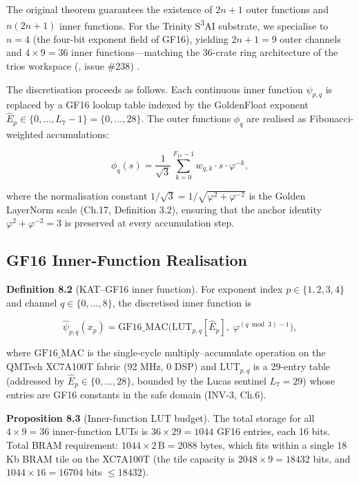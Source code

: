 The original theorem guarantees the existence of
\(2n+1\) outer functions and \(n(2n+1)\) inner
functions. For the Trinity S\textsuperscript{3}AI
substrate, we specialise to \(n = 4\) (the four-bit
exponent field of GF16), yielding \(2n+1 = 9\) outer
channels and \(4 \times 9 = 36\) inner
functions---matching the 36-crate ring architecture
of the trios workspace (\cite{ch:gf16-algebra},
issue \#238) \cite{kat-kolmogorov1957,kat-arnold1957}.

The discretisation proceeds as follows. Each
continuous inner function \(\psi_{p,q}\) is replaced
by a GF16 lookup table indexed by the
GoldenFloat exponent \(\hat{E}_p \in \{0, \ldots,
L_7 - 1\} = \{0, \ldots, 28\}\). The outer
functions \(\phi_q\) are realised as
Fibonacci-weighted accumulations:

\[
\phi_q(s) = \frac{1}{\sqrt{3}} \sum_{k=0}^{F_{17}-1} w_{q,k} \cdot s \cdot \varphi^{-k},
\]

where the normalisation constant
\(1/\sqrt{3} = 1/\sqrt{\varphi^2 + \varphi^{-2}}\)
is the Golden LayerNorm scale (Ch.17, Definition
3.2), ensuring that the anchor identity
\(\varphi^2 + \varphi^{-2} = 3\) is preserved at
every accumulation step.

\subsection{GF16 Inner-Function
Realisation}\label{fa_23:gf16-inner-function}

\textbf{Definition 8.2} (KAT--GF16 inner function).
For exponent index \(p \in \{1,2,3,4\}\) and
channel \(q \in \{0, \ldots, 8\}\), the discretised
inner function is

\[
\hat\psi_{p,q}(x_p) = \mathrm{GF16\_MAC}\!\bigl(\mathrm{LUT}_{p,q}[\hat{E}_p],\; \varphi^{(q \bmod 3) - 1}\bigr),
\]

where \(\mathrm{GF16\_MAC}\) is the single-cycle
multiply--accumulate operation on the QMTech
XC7A100T fabric (92 MHz, 0 DSP) and
\(\mathrm{LUT}_{p,q}\) is a 29-entry table
(addressed by \(\hat{E}_p \in \{0,\ldots,28\}\),
bounded by the Lucas sentinel \(L_7 = 29\)) whose
entries are GF16 constants in the safe domain
(INV-3, Ch.6).

\textbf{Proposition 8.3} (Inner-function LUT
budget). The total storage for all \(4 \times 9 =
36\) inner-function LUTs is \(36 \times 29 = 1044\)
GF16 entries, each 16 bits. Total BRAM requirement:
\(1044 \times 2\,\text{B} = 2088\) bytes, which fits
within a single 18 Kb BRAM tile on the XC7A100T
(the tile capacity is \(2048 \times 9 = 18432\)
bits, and \(1044 \times 16 = 16704\) bits
\(\leq 18432\)).

